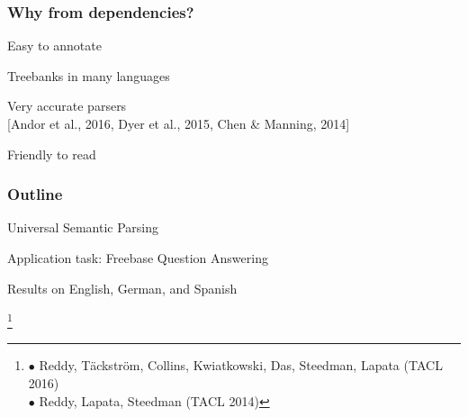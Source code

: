 \documentclass[mathserif,12pt]{beamer}
\newcommand\blfootnote[1]{%
  \begingroup
  \renewcommand\thefootnote{}\footnote{#1}%
  \addtocounter{footnote}{-1}%
  \endgroup
}
\begin{document}
\begin{frame}

\end{frame}

\begin{frame}
\frametitle{Why from dependencies?}
\large

Easy to annotate

\vspace{2em}
Treebanks in many languages

\vspace{2em}
Very accurate parsers\\
{\footnotesize [Andor et al., 2016, Dyer et al., 2015, Chen \& Manning, 2014]}


\vspace{2em}
Friendly to read
\end{frame}

\begin{frame}
\frametitle{Outline}
\large 
Universal Semantic Parsing
 
\vspace{2em}
Application task: Freebase Question Answering

\vspace{2em}
Results on English, German, and Spanish

\blfootnote{
\color{blue}
 $\bullet$ Reddy, T\"ackstr\"om, Collins, Kwiatkowski, Das, Steedman, Lapata (TACL 2016) \\
 \hspace{1.5em} $\bullet$ Reddy, Lapata, Steedman (TACL 2014)
}
\end{frame}
\end{document}

